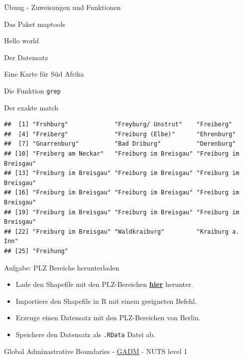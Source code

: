 \documentclass[ignorenonframetext,]{beamer}
\newenvironment{Shaded}{\begin{snugshade}}{\end{snugshade}}
\newcommand{\DataTypeTok}[1]{\textcolor[rgb]{0.74,0.68,0.62}{\underline{#1}}}
\newcommand{\FloatTok}[1]{\textcolor[rgb]{0.27,0.67,0.26}{#1}}
\newcommand{\KeywordTok}[1]{\textcolor[rgb]{0.26,0.66,0.93}{\textbf{#1}}}
\newcommand{\NormalTok}[1]{\textcolor[rgb]{0.74,0.68,0.62}{#1}}
\newcommand{\OperatorTok}[1]{\textcolor[rgb]{0.74,0.68,0.62}{#1}}
\newcommand{\StringTok}[1]{\textcolor[rgb]{0.02,0.61,0.04}{#1}}
\providecommand{\tightlist}{%
  \setlength{\itemsep}{0pt}\setlength{\parskip}{0pt}}
\begin{document}
\begin{frame}[fragile]{Übung - Zuweisungen und Funktionen}
\begin{frame}[fragile]{Das Paket maptools}
\begin{frame}[fragile]{Hello world}
\begin{frame}[fragile]{Der Datensatz}
\begin{frame}[fragile]{Eine Karte für Süd Afrika}
\begin{frame}[fragile]{Die Funktion \texttt{grep}}
\begin{block}{Der exakte match}
\begin{Shaded}
\end{Shaded}

\begin{verbatim}
##  [1] "Frohburg"             "Freyburg/ Unstrut"    "Freiberg"            
##  [4] "Freiberg"             "Freiburg (Elbe)"      "Ehrenburg"           
##  [7] "Gnarrenburg"          "Bad Driburg"          "Derenburg"           
## [10] "Freiberg am Neckar"   "Freiburg im Breisgau" "Freiburg im Breisgau"
## [13] "Freiburg im Breisgau" "Freiburg im Breisgau" "Freiburg im Breisgau"
## [16] "Freiburg im Breisgau" "Freiburg im Breisgau" "Freiburg im Breisgau"
## [19] "Freiburg im Breisgau" "Freiburg im Breisgau" "Freiburg im Breisgau"
## [22] "Freiburg im Breisgau" "Waldkraiburg"         "Kraiburg a. Inn"     
## [25] "Freihung"
\end{verbatim}

\end{block}

\end{frame}

\begin{frame}[fragile]{Aufgabe: PLZ Bereiche herunterladen}
\protect\hypertarget{aufgabe-plz-bereiche-herunterladen}{}

\begin{itemize}
\tightlist
\item
  Lade den Shapefile mit den PLZ-Bereichen
  \href{http://arnulf.us/PLZ}{\textbf{hier}} herunter.
\item
  Importiere den Shapefile in R mit einem geeigneten Befehl.
\item
  Erzeuge einen Datensatz mit den PLZ-Bereichen von Berlin.
\item
  Speichere den Datensatz als \texttt{.RData} Datei ab.
\end{itemize}

\end{frame}

\begin{frame}[fragile]{Global Adminastrative Boundaries -
\href{http://www.gadm.org/}{GADM} - NUTS level 1}
\protect\hypertarget{global-adminastrative-boundaries---gadm---nuts-level-1}{}


\end{frame}
\end{frame}
\end{frame}
\end{frame}
\end{frame}
\end{frame}
\end{document}
